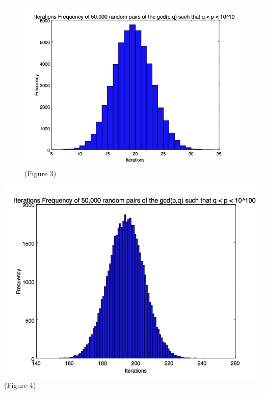 \documentclass[8pt]{beamer}
\begin{document}
\begin{frame}
\begin{figure}
		
		\center \includegraphics[scale=.3]{10_digit_numbers.jpg}
		\center \tiny(Figure 3)
\end{figure}

\end{frame}

\begin{frame}
		\center \includegraphics[scale=.3]{100_digit_numbers_freq.jpg}
		\center \tiny(Figure 4)

\end{frame}
\end{document}
